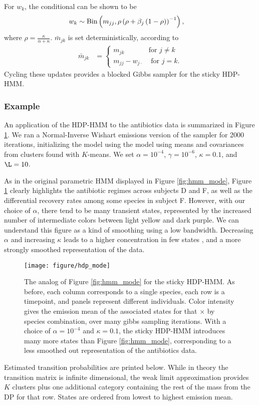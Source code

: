 \documentclass[14pt]{extreport}
\begin{document}
For $w_k$, the conditional can be shown to be
\begin{align*}
  w_k &\sim \textnormal{Bin}\left(m_{jj}, \rho\left(\rho + \beta_j\left(1 - \rho\right)\right)^{-1}\right),
\end{align*}
where $\rho = \frac{\kappa}{\alpha + \kappa}$. $\bar{m}_{jk}$ is set
deterministically, according to
\begin{align*}
  \bar{m}_{jk} &= \begin{cases}
    m_{jk} &\text{for } j \neq k\\
    m_{jj} - w_{j \cdot} &\text{ for } j = k.
  \end{cases}
\end{align*}
Cycling these updates provides a blocked Gibbs sampler for the sticky HDP-HMM.

\subsubsection{Example}
\label{subsubsec:sticky_hdp_hmm_example}

An application of the HDP-HMM to the antibiotics data is summarized in Figure
\ref{fig:hdp_mode}. We ran a Normal-Inverse Wishart emissions version of the
sampler for 2000 iterations, initializing the model using the model using means
and covariances from clusters found with $K$-means. We set $\alpha = 10^{-4}$,
$\gamma = 10^{-6}$, $\kappa = 0.1$, and $\L = 10$.

As in the original parametric HMM displayed in Figure \ref{fig:hmm_mode}, Figure
\ref{fig:hdp_mode} clearly highlights the antibiotic regimes across subjects D
and F, as well as the differential recovery rates among some species in subject
F. However, with our choice of $\alpha$, there tend to be many transient states,
represented by the increased number of intermediate colors between light yellow
and dark purple. We can understand this figure as a kind of smoothing using a
low bandwidth. Decreasing $\alpha$ and increasing $\kappa$ leads to a higher
concentration in few states , and a more strongly smoothed representation of the
data.

\begin{figure}
  \centering
  \texttt{[image: figure/hdp\_mode]}
  \caption{
    The analog of Figure \ref{fig:hmm_mode} for the sticky HDP-HMM. As before,
    each column corresponds to a single species, each row is a timepoint, and
    panels represent different individuals. Color intensity gives the emission
    mean of the associated states for that $\times$ by species combination, over
    many gibbs sampling iterations. With a choice of $\alpha = 10^{-4}$ and
    $\kappa = 0.1$, the sticky HDP-HMM introduces many more states than Figure
    \ref{fig:hmm_mode}, corresponding to a less smoothed out representation of
    the antibiotics data. \label{fig:hdp_mode} }
\end{figure}
Estimated transition probabilities are printed below. While in theory the
transition matrix is infinite dimensional, the weak limit approximation provides
$K$ clusters plus one additional category containing the rest of the mass from
the DP for that row. States are ordered from lowest to highest emission mean.
\end{document}
